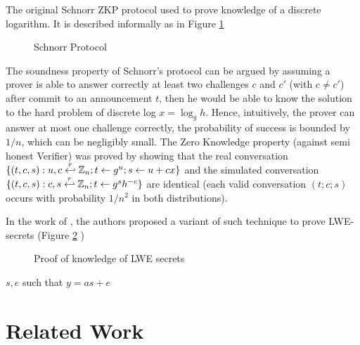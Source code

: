 The original Schnorr ZKP protocol \cite{schnorr1989efficient} used to prove knowledge of a discrete logarithm. It is described informally as in Figure \ref{fig:schnorrProtocol}

\begin{figure}[htbp!] 
\centering {}
\caption{Schnorr Protocol}
\label{fig:schnorrProtocol}
\end{figure}

The soundness property of Schnorr's protocol can be argued by assuming a prover
is able to answer correctly at least two challenges $c$ and $c'$ (with
$c \neq c'$) after commit to an announcement $t$, then he would be able to know
the solution to the hard problem of discrete log $x = \log_{g}h$. Hence,
intuitively, the prover can answer at most one challenge correctly, the
probability of success is bounded by $1/n$, which can be negligibly small. The
Zero Knowledge property (against semi honest Verifier) was proved by showing
that the real conversation
$\{(t,c,s): u,c \stackrel{r}{\hookleftarrow} \mathbb{Z}_{n}; t \gets g^{u}; s \gets u + cx\}$
and the simulated conversation
$\{(t,c,s): c, s \stackrel{r}{\hookleftarrow} \mathbb{Z}_{n}; t \gets g^{s}h^{-c}\}$ are
identical (each valid conversation $(t;c;s)$ occurs with probability $1/n^{2}$
in both distributions).

In the work of \cite{benhamouda2014better}, the authors proposed a variant of
such technique to prove LWE-secrets (Figure \ref{fig:benhamoudaProtocol} )
\begin{figure}[htbp!] 
\centering {}
\caption{Proof of knowledge of LWE secrets}
\label{fig:benhamoudaProtocol}
\end{figure}

$s, e$ such that $y = as + e$

\section{Related Work}
\label{sec:chap7RelatedWorks}



